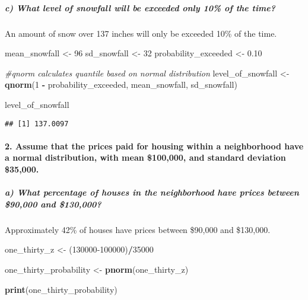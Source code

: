 \documentclass[
]{article}
\newenvironment{Shaded}{\begin{snugshade}}{\end{snugshade}}
\newcommand{\CommentTok}[1]{\textcolor[rgb]{0.56,0.35,0.01}{\textit{#1}}}
\newcommand{\DecValTok}[1]{\textcolor[rgb]{0.00,0.00,0.81}{#1}}
\newcommand{\FloatTok}[1]{\textcolor[rgb]{0.00,0.00,0.81}{#1}}
\newcommand{\FunctionTok}[1]{\textcolor[rgb]{0.13,0.29,0.53}{\textbf{#1}}}
\newcommand{\NormalTok}[1]{#1}
\newcommand{\OtherTok}[1]{\textcolor[rgb]{0.56,0.35,0.01}{#1}}
\newcommand{\SpecialCharTok}[1]{\textcolor[rgb]{0.81,0.36,0.00}{\textbf{#1}}}
\begin{document}
\hypertarget{c-what-level-of-snowfall-will-be-exceeded-only-10-of-the-time}{%
\subparagraph{c) What level of snowfall will be exceeded only 10\% of
the
time?}\label{c-what-level-of-snowfall-will-be-exceeded-only-10-of-the-time}}

An amount of snow over 137 inches will only be exceeded 10\% of the
time.

\begin{Shaded}
\begin{Highlighting}[]
\NormalTok{mean\_snowfall }\OtherTok{\textless{}{-}} \DecValTok{96}
\NormalTok{sd\_snowfall }\OtherTok{\textless{}{-}} \DecValTok{32}
\NormalTok{probability\_exceeded }\OtherTok{\textless{}{-}} \FloatTok{0.10}

\CommentTok{\#qnorm calculates quantile based on normal distribution}
\NormalTok{level\_of\_snowfall }\OtherTok{\textless{}{-}} \FunctionTok{qnorm}\NormalTok{(}\DecValTok{1} \SpecialCharTok{{-}}\NormalTok{ probability\_exceeded, mean\_snowfall, sd\_snowfall)}

\NormalTok{level\_of\_snowfall}
\end{Highlighting}
\end{Shaded}

\begin{verbatim}
## [1] 137.0097
\end{verbatim}

\hypertarget{assume-that-the-prices-paid-for-housing-within-a-neighborhood-have-a-normal-distribution-with-mean-100000-and-standard-deviation-35000.}{%
\paragraph{2. Assume that the prices paid for housing within a
neighborhood have a normal distribution, with mean \$100,000, and
standard deviation
\$35,000.}\label{assume-that-the-prices-paid-for-housing-within-a-neighborhood-have-a-normal-distribution-with-mean-100000-and-standard-deviation-35000.}}

\hypertarget{a-what-percentage-of-houses-in-the-neighborhood-have-prices-between-90000-and-130000}{%
\subparagraph{a) What percentage of houses in the neighborhood have
prices between \$90,000 and
\$130,000?}\label{a-what-percentage-of-houses-in-the-neighborhood-have-prices-between-90000-and-130000}}

Approximately 42\% of houses have prices between \$90,000 and \$130,000.

\begin{Shaded}
\begin{Highlighting}[]
\NormalTok{one\_thirty\_z }\OtherTok{\textless{}{-}}\NormalTok{ (}\DecValTok{130000{-}100000}\NormalTok{)}\SpecialCharTok{/}\DecValTok{35000}

\NormalTok{one\_thirty\_probability }\OtherTok{\textless{}{-}} \FunctionTok{pnorm}\NormalTok{(one\_thirty\_z)}

\FunctionTok{print}\NormalTok{(one\_thirty\_probability)}
\end{Highlighting}
\end{Shaded}
\end{document}

